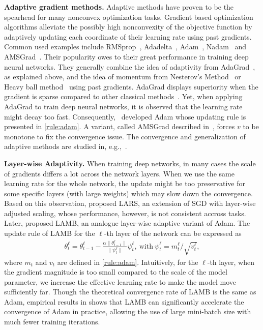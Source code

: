 \documentclass[nohyperref]{article}
\theoremstyle{plain}
\theoremstyle{definition}
\theoremstyle{remark}
\begin{document}
\noindent\textbf{Adaptive gradient methods.}
Adaptive methods have proven to be the spearhead for many nonconvex optimization tasks.
Gradient based optimization algorithms alleviate the possibly high nonconvexity of the objective function by adaptively updating each coordinate of their learning rate using past gradients. 
Common used examples include RMSprop~\citep{TH12}, Adadelta~\citep{Z12}, Adam~\citep{KB15}, Nadam~\citep{dozat2016incorporating} and AMSGrad~\citep{reddi2019convergence}.
Their popularity owes to their great performance in training deep neural networks.
They generally combine the idea of adaptivity from AdaGrad~\citep{DHS11,mcmahan2010adaptive}, as explained above, and the idea of momentum from Nesterov's Method~\citep{N04} or Heavy ball method~\citep{P64} using past gradients.
AdaGrad displays superiority when the gradient is sparse compared to other classical methods~\cite{DHS11}. Yet, when applying AdaGrad to train deep neural networks, it is observed that the learning rate might decay too fast. Consequently,~\citet{KB15} developed Adam whose updating rule is presented in \eqref{rule:adam}. 
A variant, called AMSGrad described in~\citet{reddi2019convergence}, forces $v$ to be monotone to fix the convergence issue. The convergence and generalization of adaptive methods are studied in, e.g.,~\cite{zhou2018convergence,Proc:Chen_ICLR19,zhou2020towards}. 


\noindent\textbf{Layer-wise Adaptivity.} When training deep networks, in many cases the scale of gradients differs a lot across the network layers. When we use the same learning rate for the whole network, the update might be too preservative for some specific layers (with large weights) which may slow down the convergence. Based on this observation, \citet{Proc:LARS18} proposed LARS, an extension of SGD with layer-wise adjusted scaling, whose performance, however, is not consistent accross tasks. Later, \citet{you2019large} proposed LAMB, an analogue layer-wise adaptive variant of Adam. The update rule of LAMB for the $\ell$-th layer of the network can be expressed as
\begin{align*}
    \theta_t^\ell=\theta_{t-1}^\ell-\frac{\alpha \| \theta_{t-1}^\ell\|}{\|\psi_t^\ell\|}\psi_t^\ell,\ \text{with}\ \psi_t^\ell=m_t^\ell/\sqrt{v_t^\ell},
\end{align*}
where $m_t$ and $v_t$ are defined in \eqref{rule:adam}. Intuitively, for the $\ell$-th layer, when the gradient magnitude is too small compared to the scale of the model parameter, we increase the effective learning rate to make the model move sufficiently far. Though the theoretical convergence rate of LAMB is the same as Adam, empirical results in \citet{you2019large} shows that LAMB can significantly accelerate the convergence of Adam in practice, allowing the use of large mini-batch size with much fewer training iterations. 
\end{document}
